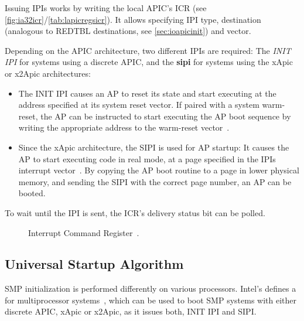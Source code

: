 Issuing IPIs works by writing the local APIC's ICR (see \autoref{fig:ia32icr}/\autoref{tab:lapicregsicr}).
It allows specifying IPI type, destination (analogous to REDTBL destinations, see \autoref{sec:ioapicinit}) and vector.

Depending on the APIC architecture, two different IPIs are required: The \textit{INIT IPI} for systems using a discrete APIC, and the \textbf{\gls{sipi}} for systems using the xApic or x2Apic architectures:

\begin{itemize}
  \item The INIT IPI causes an AP to reset its state and start executing at the address specified at its system reset vector.
  If paired with a system warm-reset, the AP can be instructed to start executing the AP boot sequence by writing the appropriate address to the warm-reset vector~\autocite[sec.~B.4.1]{mpspec}.
  \item Since the xApic architecture, the SIPI is used for AP startup: It causes the AP to start executing code in real mode, at a page specified in the IPIs interrupt vector~\autocite[sec.~B.4.2]{mpspec}.
  By copying the AP boot routine to a page in lower physical memory, and sending the SIPI with the correct page number, an AP can be booted.
\end{itemize}

To wait until the IPI is sent, the ICR's delivery status bit can be polled.

\begin{figure}[h]
  \centering
  \begin{subfigure}[b]{0.7\textwidth}
    
  \end{subfigure}
  \caption{Interrupt Command Register~\autocite[sec.~3.11.6.1]{ia32}.}
  \label{fig:ia32icr}
\end{figure}

\subsection{Universal Startup Algorithm}
\label{subsec:apstartup}

SMP initialization is performed differently on various processors.
Intel's  defines a  for multiprocessor systems~\autocite[sec.~B.4]{mpspec}, which can be used to boot SMP systems with either discrete APIC, xApic or x2Apic, as it issues both, INIT IPI and SIPI\@.

